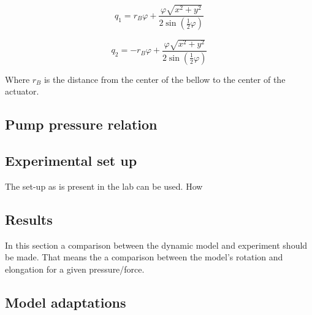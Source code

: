 \begin{equation}
    q_1 = r_B \varphi + \frac{\varphi \sqrt{x^2+y^2}}{2 \sin(\frac{1}{2}\varphi)}
\end{equation}

\begin{equation}
    q_2 = -r_B \varphi + \frac{\varphi \sqrt{x^2+y^2}}{2 \sin(\frac{1}{2}\varphi)}
\end{equation}

Where $r_B$ is the distance from the center of the bellow to the center of the actuator.


\subsection{Pump pressure relation}





\subsection{Experimental set up}


The set-up as is present in the lab can be used. How









\subsection{Results}

In this section a comparison between the dynamic model and experiment should be made. That means the a comparison between the model's rotation and elongation for a given pressure/force.  


\subsection{Model adaptations}


